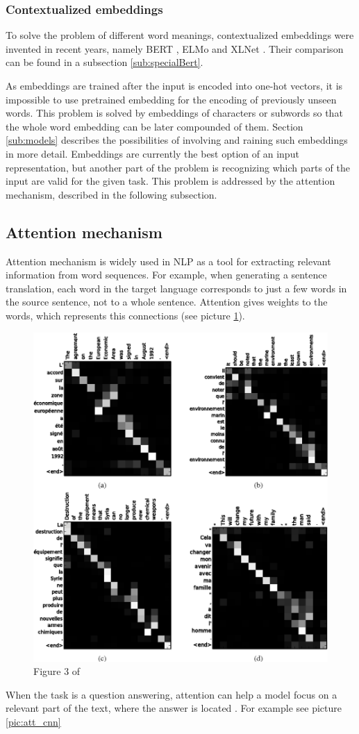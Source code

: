 \subsubsection{Contextualized embeddings}
To solve the problem of different word meanings, contextualized embeddings were invented in recent years, namely BERT \citep{Devlin2019}, ELMo \citep{Peters2018} and XLNet \citep{Yang2019}. %
Their comparison can be found in a subsection \ref{sub:specialBert}. 
\par
As embeddings are trained after the input is encoded into one-hot vectors, it is impossible to use pretrained embedding for the encoding of previously unseen words. This problem is solved by embeddings of characters or subwords so that the whole word embedding can be later compounded of them. Section \ref{sub:models} describes the possibilities of involving and raining such embeddings in more detail. Embeddings are currently the best option of an input representation, but another part of the problem is recognizing which parts of the input are valid for the given task. This problem is addressed by the attention mechanism, described in the following subsection. 

\subsection{Attention mechanism}
\label{sub:attention}
Attention mechanism \citep{Bahdanau} is widely used in NLP as a tool for extracting relevant information from word sequences. For example, when generating a sentence translation, each word in the target language corresponds to just a few words in the source sentence, not to a whole sentence. Attention gives weights to the words, which represents this connections (see picture \ref{pic:att_trans}).

\begin{figure}[h]
\includegraphics[width=0.7\columnwidth]{../img/attention_translate}
\caption{Figure 3 of \citep{Bahdanau}
}
\label{pic:att_trans}
\end{figure}
When the task is a question answering, attention can help a model focus on a relevant part of the text, where the answer is located \citep{Santos2016}. For example see picture \ref{pic:att_cnn}

